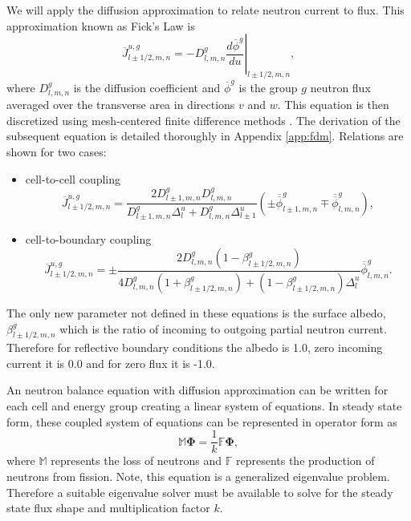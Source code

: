 \documentclass{ansconf}
\numberwithin{equation}{section}
\begin{document}
 We will apply the diffusion approximation to relate neutron current to flux. This approximation known as Fick's Law is
 \begin{equation}
     \overline{J}^{u,g}_{l\pm1/2,m,n} = -D_{l,m,n}^g\left.\frac{d\overline{\phi}^g}{du}\right|_{l\pm 1/2,m,n},
 \end{equation}
where $D_{l,m,n}^g$ is the diffusion coefficient and $\overline{\phi}^g$ is the group $g$ neutron flux averaged over the transverse area in directions $v$ and $w$. This equation is then discretized using mesh-centered finite difference methods \cite{hebert-2009}. The derivation of the subsequent equation is detailed thoroughly in Appendix \ref{app:fdm}. Relations are shown for two cases:
\begin{itemize}
	\item cell-to-cell coupling
	\begin{equation}
	    \overline{J}^{u,g}_{l\pm1/2,m,n} = \frac{2D_{l\pm1,m,n}^gD_{l,m,n}^g}{D_{l\pm1,m,n}^g\Delta_l^u + D_{l,m,n}^g\Delta_{l\pm1}^u}\left(\pm\overline{\overline{\phi}}_{l\pm1,m,n}^g\mp \overline{\overline{\phi}}_{l,m,n}^g\right),
	\end{equation}
	\item cell-to-boundary coupling
	\begin{equation}
	    \overline{J}^{u,g}_{l\pm1/2,m,n} = \pm\frac{2D_{l,m,n}^g\left(1 - \beta_{l\pm1/2,m,n}^g\right)}{4D_{l,m,n}^g\left(1 + \beta_{l\pm1/2,m,n}^g\right) + \left(1 - \beta_{l\pm1/2,m,n}^g\right)\Delta_l^u}\overline{\overline{\phi}}_{l,m,n}^g.
	\end{equation}
\end{itemize}
The only new parameter not defined in these equations is the surface albedo, $\beta_{l\pm1/2,m,n}^g$ which is the ratio of incoming to outgoing partial neutron current. Therefore for reflective boundary conditions the albedo is 1.0, zero incoming current it is 0.0 and for zero flux it is -1.0.

An neutron balance equation with diffusion approximation can be written for each cell and energy group creating a linear system of equations. In steady state form, these coupled system of equations can be represented in operator form as
\begin{equation}\label{eq:steady_oper}
    \mathbb{M}\boldsymbol{\Phi} = \frac{1}{k}\mathbb{F}\boldsymbol{\Phi},
\end{equation}
where $\mathbb{M}$ represents the loss of neutrons and $\mathbb{F}$ represents the production of neutrons from fission. Note, this equation is a generalized eigenvalue problem. Therefore a suitable eigenvalue solver must be available to solve for the steady state flux shape and multiplication factor $k$.
\end{document}
